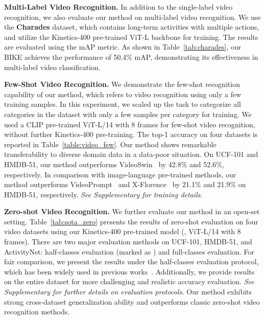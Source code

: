 \documentclass[10pt,twocolumn,letterpaper]{article}
\begin{document}
\noindent\textbf{Multi-Label Video Recognition.}\label{exp:ml_video}
In addition to the single-label video recognition, we also evaluate our method on multi-label video recognition. We use the \textbf{Charades} dataset, which contains long-term activities with multiple actions, and utilize the Kinetics-400 pre-trained ViT-L backbone for training. The results are evaluated using the mAP metric. As shown in Table~\ref{tab:charades}, our BIKE achieves the performance of 50.4\% mAP, demonstrating its effectiveness in multi-label video classification.

\noindent\textbf{Few-Shot Video Recognition.}\label{exp:video_fewshot}
We demonstrate the few-shot recognition capability of our method, which refers to video recognition using only a few training samples. In this experiment, we scaled up the task to categorize all categories in the dataset with only a few samples per category for training. We used a CLIP pre-trained ViT-L/14 with 8 frames for few-shot video recognition, without further Kinetics-400 pre-training. The top-1 accuracy on four datasets is reported in Table~\ref{table:video_few}. Our method shows remarkable transferability to diverse domain data in a data-poor situation.
On UCF-101 and HMDB-51, our method outperforms VideoSwin~\cite{videoswin} by 42.8\% and 52.6\%, respectively. In comparison with image-language pre-trained methods, our method outperforms VideoPrompt~\cite{ju2022prompting} and X-Florence~\cite{x-clip} by 21.1\% and 21.9\% on HMDB-51, respectively. 
\emph{See Supplementary for training details.}




\noindent\textbf{Zero-shot Video Recognition.}\label{exp:zero_video}
We further evaluate our method in an open-set setting. Table~\ref{tab:sota_zero} presents the results of zero-shot evaluation on four video datasets using our Kinetics-400 pre-trained model (\ie, ViT-L/14 with 8 frames).
There are two major evaluation methods on UCF-101, HMDB-51, and ActivityNet: half-classes evaluation (marked as ) and full-classes evaluation. For fair comparison, we present the results under the half-classes evaluation protocol, which has been widely used in previous works~\cite{GA,E2E,ER,ResT}. Additionally, we provide results on the entire dataset for more challenging and realistic accuracy evaluation.
\emph{See Supplementary for further details on evaluation protocols.}
Our method exhibits strong cross-dataset generalization ability and outperforms classic zero-shot video recognition methods. 
\end{document}
